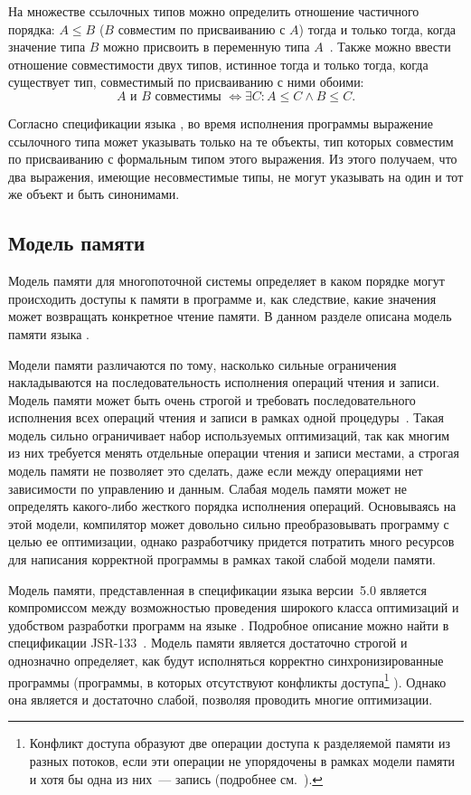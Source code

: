 \documentclass[14pt,titlepage,draft]{extarticle}
\newcommand{\java}{\eng{Java}\xspace}
\begin{document}
    На множестве ссылочных типов можно определить отношение частичного
    порядка: $A \leq B$ ($B$ совместим по присваиванию с $A$) тогда и только
    тогда, когда значение типа $B$ можно присвоить
    в переменную типа $A$~\cite{nastia_type_analysis}.
    Также можно ввести отношение совместимости двух типов, истинное тогда и
    только тогда, когда существует тип, совместимый по присваиванию с ними
    обоими:
    \[
      A \text{ и } B \text{ совместимы }
      \Leftrightarrow
      \exists C\colon A \leq C \land B \leq C.
    \]

    Согласно спецификации языка \java, во время исполнения программы
    выражение ссылочного типа может указывать только на те объекты, тип
    которых совместим по присваиванию с формальным типом этого выражения.
    Из этого получаем, что два выражения, имеющие несовместимые типы, не
    могут указывать на один и тот же объект и быть синонимами.

  \subsection{Модель памяти}

    Модель памяти для многопоточной системы определяет в каком
    порядке могут происходить доступы к памяти в программе и, как следствие,
    какие значения может возвращать конкретное чтение памяти. В данном разделе
    описана модель памяти языка \java.

    Модели памяти различаются по тому, насколько сильные ограничения
    накладываются на последовательность исполнения операций чтения и записи.
    Модель памяти может быть очень строгой и требовать последовательного
    исполнения всех операций чтения и записи в рамках одной процедуры~\cite{lamport}.
    Такая модель сильно ограничивает набор используемых оптимизаций, так как
    многим из них требуется менять отдельные операции чтения и записи местами,
    а строгая модель памяти не позволяет это сделать, даже если между
    операциями нет зависимости по управлению и данным.
    Слабая модель памяти может не определять какого-либо жесткого порядка
    исполнения операций. Основываясь на этой модели, компилятор может довольно
    сильно преобразовывать программу с целью ее оптимизации, однако
    разработчику придется потратить много ресурсов для написания корректной
    программы в рамках такой слабой модели памяти.

    Модель памяти, представленная в спецификации языка \java версии~5.0
    является компромиссом между возможностью проведения широкого класса
    оптимизаций и удобством разработки программ на языке \java. Подробное
    описание можно найти в спецификации JSR-133~\cite{jsr133}. Модель памяти
    является достаточно строгой и однозначно определяет, как будут исполняться
    корректно синхронизированные программы (программы, в которых отсутствуют
    конфликты доступа\footnote{
      Конфликт доступа  образуют две операции доступа к
      разделяемой памяти из разных потоков, если эти операции не упорядочены в
      рамках модели памяти и хотя бы одна из них~--- запись (подробнее
      см.~\cite[раздел~2.1]{manson_jmm}).
    } ). Однако она является и достаточно слабой,
    позволяя проводить многие оптимизации.
\end{document}
